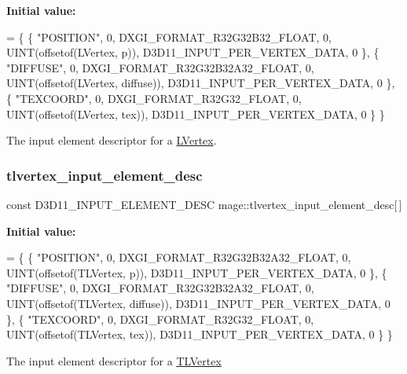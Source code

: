 {\bfseries Initial value\+:}
\begin{DoxyCode}
= \{
        \{ \textcolor{stringliteral}{"POSITION"}, 0, DXGI\_FORMAT\_R32G32B32\_FLOAT,    0, UINT(offsetof(LVertex, p)),       
      D3D11\_INPUT\_PER\_VERTEX\_DATA, 0 \},
        \{ \textcolor{stringliteral}{"DIFFUSE"},  0, DXGI\_FORMAT\_R32G32B32A32\_FLOAT, 0, UINT(offsetof(LVertex, diffuse)), 
      D3D11\_INPUT\_PER\_VERTEX\_DATA, 0 \},
        \{ \textcolor{stringliteral}{"TEXCOORD"}, 0, DXGI\_FORMAT\_R32G32\_FLOAT,       0, UINT(offsetof(LVertex, tex)),     
      D3D11\_INPUT\_PER\_VERTEX\_DATA, 0 \}
    \}
\end{DoxyCode}
The input element descriptor for a \hyperlink{structmage_1_1_l_vertex}{L\+Vertex}. \hypertarget{namespacemage_a0f27594da3814c163fe995326acf6c5e}{}\label{namespacemage_a0f27594da3814c163fe995326acf6c5e} 
\subsubsection{\texorpdfstring{tlvertex\+\_\+input\+\_\+element\+\_\+desc}{tlvertex\_input\_element\_desc}}
{\footnotesize\ttfamily const D3\+D11\+\_\+\+I\+N\+P\+U\+T\+\_\+\+E\+L\+E\+M\+E\+N\+T\+\_\+\+D\+E\+SC mage\+::tlvertex\+\_\+input\+\_\+element\+\_\+desc\mbox{[}$\,$\mbox{]}}

{\bfseries Initial value\+:}
\begin{DoxyCode}
= \{
        \{ \textcolor{stringliteral}{"POSITION"}, 0, DXGI\_FORMAT\_R32G32B32A32\_FLOAT, 0, UINT(offsetof(TLVertex, p)),       
      D3D11\_INPUT\_PER\_VERTEX\_DATA, 0 \},
        \{ \textcolor{stringliteral}{"DIFFUSE"},  0, DXGI\_FORMAT\_R32G32B32A32\_FLOAT, 0, UINT(offsetof(TLVertex, diffuse)), 
      D3D11\_INPUT\_PER\_VERTEX\_DATA, 0 \},
        \{ \textcolor{stringliteral}{"TEXCOORD"}, 0, DXGI\_FORMAT\_R32G32\_FLOAT,       0, UINT(offsetof(TLVertex, tex)),     
      D3D11\_INPUT\_PER\_VERTEX\_DATA, 0 \}
    \}
\end{DoxyCode}
The input element descriptor for a \hyperlink{structmage_1_1_t_l_vertex}{T\+L\+Vertex} \hypertarget{namespacemage_a8647e0bbbbe87e5c6d7a4d4622230119}{}\label{namespacemage_a8647e0bbbbe87e5c6d7a4d4622230119} 
